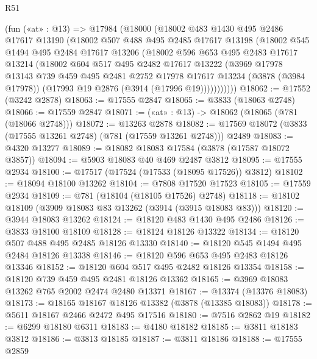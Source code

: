 \begin{lexlean}{R51}
\begin{coremodule}
    (fun («at» : @13) =>
    @17984
      (@18000
        (@18002
          @483
          @1430
          @495
          @2486
          @17617
          @13190
          (@18002
            @507
            @488
            @495
            @2485
            @17617
            @13198
            (@18002
              @545
              @1494
              @495
              @2484
              @17617
              @13206
              (@18002
                @596
                @653
                @495
                @2483
                @17617
                @13214
                (@18002
                  @604
                  @517
                  @495
                  @2482
                  @17617
                  @13222
                  (@3969
                    @17978
                    @13143
                    @739
                    @459
                    @495
                    @2481
                    @2752
                    @17978
                    @17617
                    @13234
                    (@3878 (@3984 @17978))
                    (@17993 @19 @2876 (@3914 (@17996 @19)))))))))))
@18062 := @17552 (@3242 @2878)
@18063 := @17555 @2847
@18065 := @3833 (@18063 @2748)
@18066 := @17559 @2847
@18071 := («at» : @13) -> @18062 (@18065 (@781 (@18066 @2748)))
@18072 := @13263 @2878
@18082 := @17569 @18072 (@3833 (@17555 @13261 @2748) (@781 (@17559 @13261 @2748))) @2489
@18083 := @4320 @13277
@18089 := @18082 @18083 @17584 (@3878 (@17587 @18072 @3857))
@18094 := @5903 @18083 @40 @469 @2487 @3812
@18095 := @17555 @2934
@18100 := @17517 (@17524 (@17533 (@18095 @17526)) @3812)
@18102 := @18094 @18100 @13262
@18104 := @7808 @17520 @17523
@18105 := @17559 @2934
@18109 := @781 (@18104 (@18105 @17526) @2748)
@18118 := @18102 @18109 (@3909 @18083 @83 @13262 (@3914 (@3915 @18083 @83)))
@18120 := @3944 @18083 @13262
@18124 := @18120 @483 @1430 @495 @2486
@18126 := @3833 @18100 @18109
@18128 := @18124 @18126 @13322
@18134 := @18120 @507 @488 @495 @2485 @18126 @13330
@18140 := @18120 @545 @1494 @495 @2484 @18126 @13338
@18146 := @18120 @596 @653 @495 @2483 @18126 @13346
@18152 := @18120 @604 @517 @495 @2482 @18126 @13354
@18158 := @18120 @739 @459 @495 @2481 @18126 @13362
@18165 := @3969 @18083 @13262 @765 @2002 @2474 @2480 @13371
@18167 := @13374 (@13376 @18083)
@18173 := @18165 @18167 @18126 @13382 (@3878 (@13385 @18083))
@18178 := @5611 @18167 @2466 @2472 @495 @17516
@18180 := @7516 @2862 @19
@18182 := @6299 @18180 @6311
@18183 := @4180 @18182
@18185 := @3811 @18183 @3812
@18186 := @3813 @18185
@18187 := @3811 @18186
@18188 := @17555 @2859

\end{coremodule}
\end{lexlean}
